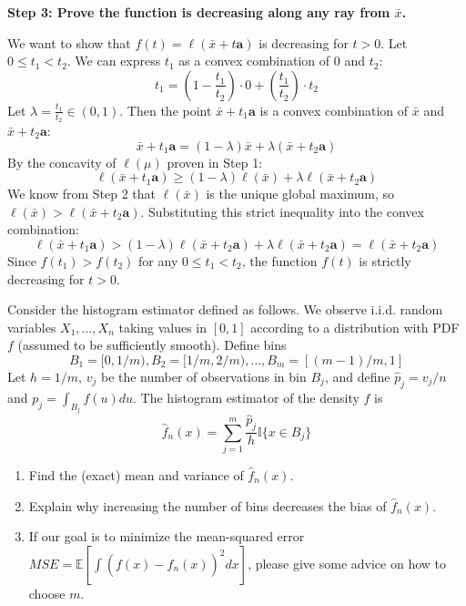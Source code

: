 \begin{solution}
\textbf{Step 3: Prove the function is decreasing along any ray from $\bar{x}$.}

We want to show that $f(t) = \ell(\bar{x} + t\mathbf{a})$ is decreasing for $t > 0$.
Let $0 \leq t_1 < t_2$. We can express $t_1$ as a convex combination of $0$ and $t_2$:
\[ t_1 = \left(1 - \frac{t_1}{t_2}\right) \cdot 0 + \left(\frac{t_1}{t_2}\right) \cdot t_2 \]
Let $\lambda = \frac{t_1}{t_2} \in (0, 1)$.
Then the point $\bar{x} + t_1\mathbf{a}$ is a convex combination of $\bar{x}$ and $\bar{x} + t_2\mathbf{a}$:
\[ \bar{x} + t_1\mathbf{a} = (1-\lambda) \bar{x} + \lambda (\bar{x} + t_2\mathbf{a}) \]
By the concavity of $\ell(\mu)$ proven in Step 1:
\[ \ell(\bar{x} + t_1\mathbf{a}) \geq (1-\lambda) \ell(\bar{x}) + \lambda \ell(\bar{x} + t_2\mathbf{a}) \]
We know from Step 2 that $\ell(\bar{x})$ is the unique global maximum, so $\ell(\bar{x}) > \ell(\bar{x} + t_2\mathbf{a})$.
Substituting this strict inequality into the convex combination:
\[ \ell(\bar{x} + t_1\mathbf{a}) > (1-\lambda) \ell(\bar{x} + t_2\mathbf{a}) + \lambda \ell(\bar{x} + t_2\mathbf{a}) = \ell(\bar{x} + t_2\mathbf{a}) \]
Since $f(t_1) > f(t_2)$ for any $0 \leq t_1 < t_2$, the function $f(t)$ is strictly decreasing for $t > 0$.
\end{solution}

\begin{exercise}\label{probability:2018:9}
Consider the histogram estimator defined as follows. We observe i.i.d. random variables $X_1, \dots, X_n$ taking values in $[0, 1]$ according to a distribution with PDF $f$ (assumed to be sufficiently smooth). Define bins
\[
B_1 = [0, 1/m), B_2 = [1/m, 2/m), \dots, B_m = [(m-1)/m, 1]
\]
Let $h = 1/m$, $v_j$ be the number of observations in bin $B_j$, and define $\hat{p}_j = v_j/n$ and $p_j = \int_{B_j} f(u) du$. The histogram estimator of the density $f$ is
\[
\hat{f}_n(x) = \sum_{j=1}^m \frac{\hat{p}_j}{h} \mathbb{I}\{x \in B_j\}
\]
\begin{enumerate}
    \item Find the (exact) mean and variance of $\hat{f}_n(x)$.
    \item Explain why increasing the number of bins decreases the bias of $\hat{f}_n(x)$.
    \item If our goal is to minimize the mean-squared error $MSE = \mathbb{E} \left[ \int (f(x) - \hat{f}_n(x))^2 dx \right]$, please give some advice on how to choose $m$.
\end{enumerate}
\end{exercise}

